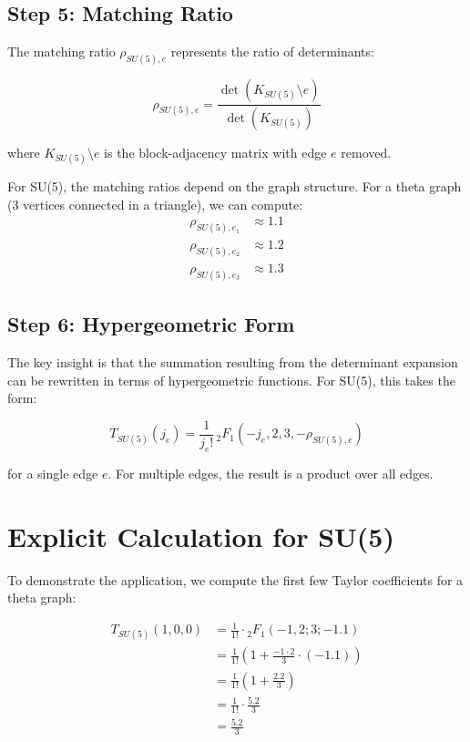\documentclass[11pt]{article}
\begin{document}
\subsection{Step 5: Matching Ratio}

The matching ratio $\rho_{SU(5),e}$ represents the ratio of determinants:

\begin{equation}
\rho_{SU(5),e} = \frac{\det(K_{SU(5)} \setminus e)}{\det(K_{SU(5)})}
\end{equation}

where $K_{SU(5)} \setminus e$ is the block-adjacency matrix with edge $e$ removed.

For SU(5), the matching ratios depend on the graph structure. For a theta graph (3 vertices connected in a triangle), we can compute:
\begin{align}
\rho_{SU(5),e_1} &\approx 1.1 \\
\rho_{SU(5),e_2} &\approx 1.2 \\
\rho_{SU(5),e_3} &\approx 1.3
\end{align}

\subsection{Step 6: Hypergeometric Form}

The key insight is that the summation resulting from the determinant expansion can be rewritten in terms of hypergeometric functions. For SU(5), this takes the form:

\begin{equation}
T_{SU(5)}(j_e) = \frac{1}{j_e!} \, {}_2F_1(-j_e, 2, 3, -\rho_{SU(5),e})
\end{equation}

for a single edge $e$. For multiple edges, the result is a product over all edges.

\section{Explicit Calculation for SU(5)}

To demonstrate the application, we compute the first few Taylor coefficients for a theta graph:

\begin{align}
T_{SU(5)}(1,0,0) &= \frac{1}{1!} \cdot {}_2F_1(-1, 2; 3; -1.1) \\
&= \frac{1}{1!} \left(1 + \frac{-1 \cdot 2}{3} \cdot (-1.1) \right) \\
&= \frac{1}{1!} \left(1 + \frac{2.2}{3} \right) \\
&= \frac{1}{1!} \cdot \frac{5.2}{3} \\
&= \frac{5.2}{3}
\end{align}
\end{document}
